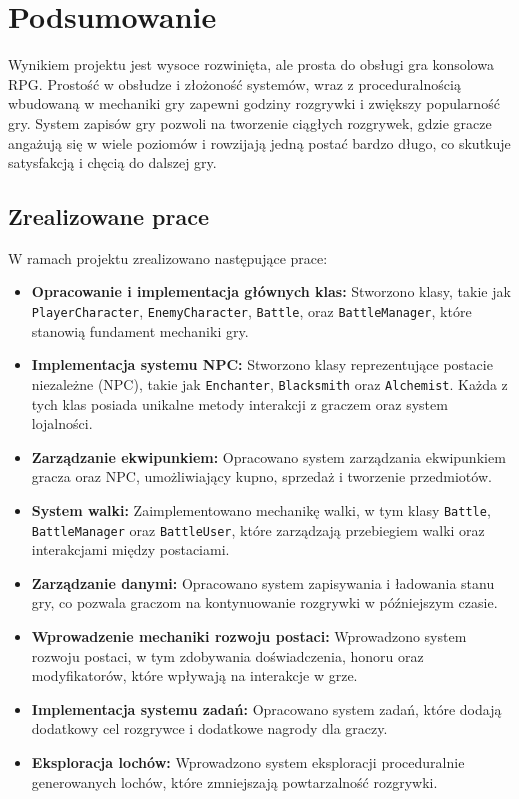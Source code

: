 ﻿%
\chapter{Podsumowanie}

Wynikiem projektu jest wysoce rozwinięta, ale prosta do obsługi gra konsolowa RPG. Prostość w obsłudze i złożoność systemów, wraz z
proceduralnością wbudowaną w mechaniki gry zapewni godziny rozgrywki i zwiększy popularność gry. System zapisów gry pozwoli na tworzenie ciągłych 
rozgrywek, gdzie gracze angażują się w wiele poziomów i rowzijają jedną postać bardzo długo, co skutkuje satysfakcją i chęcią do dalszej gry.

\section{Zrealizowane prace}

W ramach projektu zrealizowano następujące prace:

\begin{itemize}
    \item \textbf{Opracowanie i implementacja głównych klas:} Stworzono klasy, takie jak \texttt{PlayerCharacter}, \texttt{EnemyCharacter}, \texttt{Battle}, oraz \texttt{BattleManager}, które stanowią fundament mechaniki gry.
    \item \textbf{Implementacja systemu NPC:} Stworzono klasy reprezentujące postacie niezależne (NPC), takie jak \texttt{Enchanter}, \texttt{Blacksmith} oraz \texttt{Alchemist}. Każda z tych klas posiada unikalne metody interakcji z graczem oraz system lojalności.
    \item \textbf{Zarządzanie ekwipunkiem:} Opracowano system zarządzania ekwipunkiem gracza oraz NPC, umożliwiający kupno, sprzedaż i tworzenie przedmiotów.
    \item \textbf{System walki:} Zaimplementowano mechanikę walki, w tym klasy \texttt{Battle}, \texttt{BattleManager} oraz \texttt{BattleUser}, które zarządzają przebiegiem walki oraz interakcjami między postaciami.
    \item \textbf{Zarządzanie danymi:} Opracowano system zapisywania i ładowania stanu gry, co pozwala graczom na kontynuowanie rozgrywki w późniejszym czasie.
    \item \textbf{Wprowadzenie mechaniki rozwoju postaci:} Wprowadzono system rozwoju postaci, w tym zdobywania doświadczenia, honoru oraz modyfikatorów, które wpływają na interakcje w grze.
    \item \textbf{Implementacja systemu zadań:} Opracowano system zadań, które dodają dodatkowy cel rozgrywce i dodatkowe nagrody dla graczy.
    \item \textbf{Eksploracja lochów:} Wprowadzono system eksploracji proceduralnie generowanych lochów, które zmniejszają powtarzalność rozgrywki.

\end{itemize}

